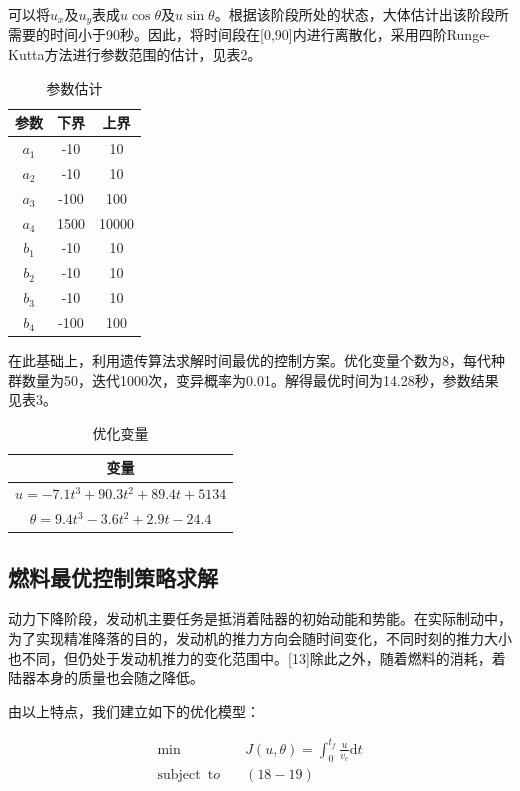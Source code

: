 \documentclass[UTF8,12pt]{ctexart}
\begin{document}
可以将$u_x$及$u_y$表成$u\cos\theta$及$u\sin\theta$。根据该阶段所处的状态，大体估计出该阶段所需要的时间小于90秒。因此，将时间段在[0,90]内进行离散化，采用四阶Runge-Kutta方法进行参数范围的估计，见表2。

\begin{table}[h]
	\centering
	\begin{tabular}{ccc}  
		\toprule   
		\heiti 参数&\heiti 下界&\heiti 上界\\  
		\midrule   
		$a_1$&-10&10\\
		$a_2$&-10&10\\
		$a_3$&-100&100\\
		$a_4$&1500&10000\\
		$b_1$&-10&10\\
		$b_2$&-10&10\\
		$b_3$&-10&10\\
		$b_4$&-100&100\\
		\bottomrule  
	\end{tabular}
\caption{参数估计}
\end{table}

在此基础上，利用遗传算法求解时间最优的控制方案。优化变量个数为8，每代种群数量为50，迭代1000次，变异概率为0.01。解得最优时间为14.28秒，参数结果见表3。

\begin{table}[h]
	\centering
	\begin{tabular}{c}  
		\toprule   
		\heiti 变量\\  
		\midrule   
		$u=-7.1t^3+90.3t^2+89.4t+5134$\\
		$\theta=9.4t^3-3.6t^2+2.9t-24.4$\\
		\bottomrule  
	\end{tabular}
\caption{优化变量}
\end{table}


\subsection{燃料最优控制策略求解}

动力下降阶段，发动机主要任务是抵消着陆器的初始动能和势能。在实际制动中，为了实现精准降落的目的，发动机的推力方向会随时间变化，不同时刻的推力大小也不同，但仍处于发动机推力的变化范围中。[13]除此之外，随着燃料的消耗，着陆器本身的质量也会随之降低。

由以上特点，我们建立如下的优化模型：

\begin{equation}
	\begin{aligned}
	\min\quad&J(u,\theta)=\int^{t_f}_0\frac{u}{v_e}\mathrm{d}t\\
	\mathrm{subject\enspace t}o\quad&(18-19)
	\end{aligned}
\end{equation}
\end{document}
